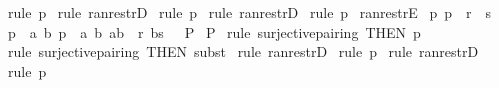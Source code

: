 \begin{isabellebody}
%
\isadelimproof
%
\endisadelimproof
%
\isatagproof
{}\isamarkupfalse%
\ {\isacharparenleft}rule\ p{}{\isacharparenright}\isanewline
{}\isamarkupfalse%
\ {\isacharparenleft}rule\ ran{\isacharunderscore}restrD{}{\isacharparenright}\isanewline
{}\isamarkupfalse%
\ {\isacharparenleft}rule\ p{}{\isacharparenright}\isanewline
{}\isamarkupfalse%
\ {\isacharparenleft}rule\ ran{\isacharunderscore}restrD{}{\isacharparenright}\isanewline
{}\isamarkupfalse%
\ {\isacharparenleft}rule\ p{}{\isacharparenright}\isanewline
{}\isamarkupfalse%
%
\endisatagproof
{\isafoldproof}%
%
\isadelimproof
\isanewline
%
\endisadelimproof
\isanewline
\isanewline
{}\isamarkupfalse%
\ ran{\isacharunderscore}restrE{\isacharcolon}\isanewline
{}\ p{}{\isacharcolon}\ {\isachardoublequoteopen}p\ {\isacharcolon}\ {\isacharparenleft}r\ {\isacharcolon}{\isachargreater}\ s{\isacharparenright}{\isachardoublequoteclose}\isanewline
{}\ p{}{\isacharcolon}\ {\isachardoublequoteopen}{\isacharbang}{\isacharbang}\ a\ b{\isachardot}{\isacharbrackleft}{\isacharbar}\ p\ {\isacharequal}\ {\isacharparenleft}a{\isacharcomma}\ b{\isacharparenright}{\isacharsemicolon}\ {\isacharparenleft}a{\isacharcomma}b{\isacharparenright}\ {\isacharcolon}\ r{\isacharsemicolon}\ b{\isacharcolon}s\ {\isacharbar}{\isacharbrackright}\ {\isacharequal}{\isacharequal}{\isachargreater}\ P{\isachardoublequoteclose}\isanewline
{}\ {\isachardoublequoteopen}P{\isachardoublequoteclose}\isanewline
%
\isadelimproof
%
\endisadelimproof
%
\isatagproof
{}\isamarkupfalse%
\ {\isacharparenleft}rule\ surjective{\isacharunderscore}pairing\ {\isacharbrackleft}THEN\ p{}{\isacharbrackright}{\isacharparenright}\isanewline
{}\isamarkupfalse%
\ {\isacharparenleft}rule\ surjective{\isacharunderscore}pairing\ {\isacharbrackleft}THEN\ subst{\isacharbrackright}{\isacharparenright}\isanewline
{}\isamarkupfalse%
\ {\isacharparenleft}rule\ ran{\isacharunderscore}restrD{}{\isacharparenright}\isanewline
{}\isamarkupfalse%
\ {\isacharparenleft}rule\ p{}{\isacharparenright}\isanewline
{}\isamarkupfalse%
\ {\isacharparenleft}rule\ ran{\isacharunderscore}restrD{}{\isacharparenright}\isanewline
{}\isamarkupfalse%
\ {\isacharparenleft}rule\ p{}{\isacharparenright}\isanewline

\end{isabellebody}
